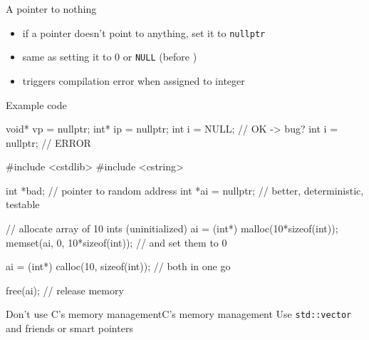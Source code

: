 \begin{frame}[fragile]
  \begin{block}{A pointer to nothing}
    \begin{itemize}
    \item if a pointer doesn't point to anything, set it to \texttt{nullptr}
    \item same as setting it to 0 or \texttt{NULL} (before )
    \item triggers compilation error when assigned to integer
    \end{itemize}
  \end{block}
  \pause
  \begin{exampleblock}{Example code}
    \begin{cppcode*}{}
      void* vp = nullptr;
      int* ip = nullptr;
      int i = NULL;      // OK -> bug?
      int i = nullptr;   // ERROR
    \end{cppcode*}
  \end{exampleblock}
\end{frame}

\begin{frame}[fragile]
  \begin{cppcode}
    #include <cstdlib>
    #include <cstring>

    int *bad;          // pointer to random address
    int *ai = nullptr; // better, deterministic, testable

    // allocate array of 10 ints (uninitialized)
    ai = (int*) malloc(10*sizeof(int));
    memset(ai, 0, 10*sizeof(int)); // and set them to 0

    ai = (int*) calloc(10, sizeof(int)); // both in one go

    free(ai); // release memory
  \end{cppcode}
  \begin{goodpracticeWithShortcut}{Don't use C's memory management}{C's memory management}
    Use \texttt{std::vector} and friends or smart pointers
  \end{goodpracticeWithShortcut}
\end{frame}
